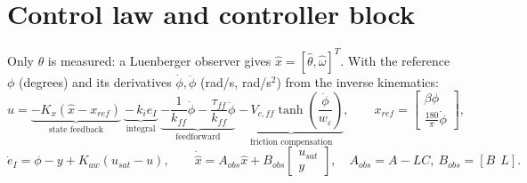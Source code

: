 \documentclass[10pt,a4paper]{article}
\begin{document}
\section{Control law and controller block}\label{sec:ctrl}

Only $\theta$ is measured: a Luenberger observer gives $\hat x=[\hat\theta,\hat\omega]^T$. With the reference
$\phi$ (degrees) and its derivatives $\dot\phi,\ddot\phi$ (rad/s, rad/s$^2$) from the inverse kinematics:
\begin{equation}\label{eq:law}
  u = \underbrace{-K_x\left(\hat x - x_{ref}\right)}_{\text{state feedback}}
      \;\underbrace{-\,k_i e_I}_{\text{integral}}
      \;\underbrace{-\frac{1}{k_{ff}}\dot\phi - \frac{\tau_{ff}}{k_{ff}}\ddot\phi}_{\text{feedforward}}
      \;\underbrace{-\,V_{c,ff}\tanh\!\left(\frac{\dot\phi}{w_\varepsilon}\right)}_{\text{friction compensation}},
  \qquad x_{ref}=\begin{bmatrix}\beta\phi\\ \tfrac{180}{\pi}\dot\phi\end{bmatrix},
\end{equation}
\begin{equation}
  \dot e_I = \phi - y + K_{aw}(u_{sat}-u),\qquad
  \dot{\hat x} = A_{obs}\hat x + B_{obs}\begin{bmatrix}u_{sat}\\ y\end{bmatrix},\quad A_{obs}=A-LC,\ B_{obs}=[B\ \ L].
\end{equation}
\end{document}
